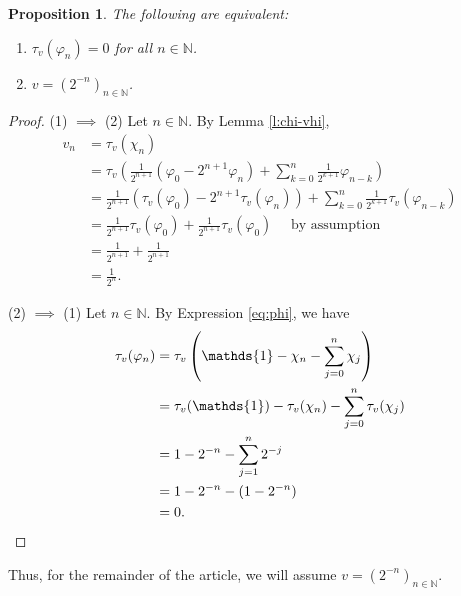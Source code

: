 \documentclass[]{amsart}
\newcommand{\ninn}{n \in \N}
\newcommand{\vhi}{{\varphi}}
\newcommand{\N}{{\mathds{N}}}
\theoremstyle{plain}
\newtheorem{proposition}[theorem]{Proposition}
\theoremstyle{definition}
\theoremstyle{remark}
\numberwithin{equation}{section}
\begin{document}
\begin{proposition}\label{p:best-sequence} 
     The following are equivalent: 
    \begin{enumerate}
        \item $\tau_v (\vhi_n) = 0 $ for all $\ninn$.
        \item $v=(2^{-n})_{\ninn}$.
    \end{enumerate}
     \end{proposition}
    \begin{proof} 
     (1) $\implies$ (2) 
   Let $\ninn$. By Lemma \ref{l:chi-vhi},
   \begin{align*}
       v_n&=\tau_v(\chi_n)\\
       & = \tau_v\left(\frac{1}{2^{n+1}}(\vhi_0-2^{n+1}\vhi_n)+\sum_{k=0}^{n}\frac{1}{2^{k+1}}\vhi_{n-k}\right)\\
       & = \frac{1}{2^{n+1}}(\tau_v(\vhi_0)-2^{n+1}\tau_v(\vhi_n))+\sum_{k=0}^{n}\frac{1}{2^{k+1}}\tau_v(\vhi_{n-k})\\
        & = \frac{1}{2^{n+1}}\tau_v(\vhi_0)+\frac{1}{2^{n+1}}\tau_v(\vhi_0) \quad \text{ by assumption}\\
        & = \frac{1}{2^{n+1}}+\frac{1}{2^{n+1}}\\
        &=\frac{1}{2^n}.
   \end{align*}
   
   (2) $\implies$ (1)  Let $\ninn$. By Expression \eqref{eq:phi}, we have
   \begin{align*}
       \tau_v(\vhi_n)&=\tau_v\left(\mathds{1}-\chi_n-\sum_{j=0}^n \chi_j\right)\\
                     &=\tau_v(\mathds{1})-\tau_v(\chi_n)-\sum_{j=0}^n \tau_v(\chi_j)\\
                     &=1-2^{-n}-\sum_{j=1}^n 2^{-j}\\
                     &=1-2^{-n}-(1-2^{-n})\\
                     &=0 \qedhere.
   \end{align*}
    \end{proof} 
    Thus, for the remainder of the article, we will assume $v=(2^{-n})_{\ninn}$.
    
\end{document}
